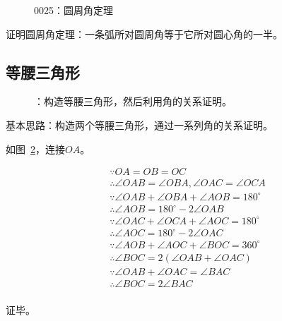 

\begin{figure}[htbp]
  \centering
  \caption{0025：圆周角定理} \label{fig:0025}
\end{figure}

证明圆周角定理：一条弧所对圆周角等于它所对圆心角的一半。

\subsection{等腰三角形} \label{subsec:0025-eqtri}

\begin{figure}[htbp]
  \centering
  \caption{：构造等腰三角形，然后利用角的关系证明。}
  \label{fig:0025-eqtri}
\end{figure}

基本思路：构造两个等腰三角形，通过一系列角的关系证明。

如图~\ref{fig:0025-eqtri}，连接$OA$。

\begin{align*}
  &\because   OA = OB = OC \\
  &\therefore \angle OAB = \angle OBA, \angle OAC = \angle OCA \\
  &\because   \angle OAB + \angle OBA + \angle AOB = 180^\circ \\
  &\therefore \angle AOB = 180^\circ - 2\angle OAB \\
  &\because   \angle OAC + \angle OCA + \angle AOC = 180^\circ \\
  &\therefore \angle AOC = 180^\circ - 2\angle OAC \\
  &\because   \angle AOB + \angle AOC + \angle BOC = 360^\circ \\
  &\therefore \angle BOC = 2(\angle OAB + \angle OAC) \\
  &\because   \angle OAB + \angle OAC = \angle BAC \\
  &\therefore \angle BOC = 2\angle BAC \\
\end{align*}

证毕。

